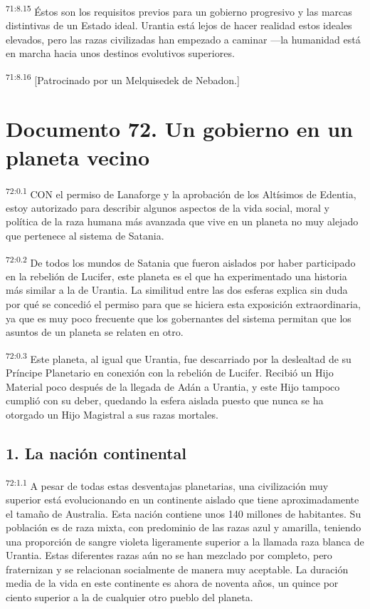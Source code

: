 \documentclass[twoside, 11pt]{book}
\begin{document}
\par
\textsuperscript{71:8.15} Éstos son los requisitos previos para un gobierno progresivo y las marcas distintivas de un Estado ideal. Urantia está lejos de hacer realidad estos ideales elevados, pero las razas civilizadas han empezado a caminar ---la humanidad está en marcha hacia unos destinos evolutivos superiores.

\par
\textsuperscript{71:8.16} [Patrocinado por un Melquisedek de Nebadon.]


\chapter{Documento 72. Un gobierno en un planeta vecino}
\par
\textsuperscript{72:0.1} CON el permiso de Lanaforge y la aprobación de los Altísimos de Edentia, estoy autorizado para describir algunos aspectos de la vida social, moral y política de la raza humana más avanzada que vive en un planeta no muy alejado que pertenece al sistema de Satania.

\par
\textsuperscript{72:0.2} De todos los mundos de Satania que fueron aislados por haber participado en la rebelión de Lucifer, este planeta es el que ha experimentado una historia más similar a la de Urantia. La similitud entre las dos esferas explica sin duda por qué se concedió el permiso para que se hiciera esta exposición extraordinaria, ya que es muy poco frecuente que los gobernantes del sistema permitan que los asuntos de un planeta se relaten en otro.

\par
\textsuperscript{72:0.3} Este planeta, al igual que Urantia, fue descarriado por la deslealtad de su Príncipe Planetario en conexión con la rebelión de Lucifer. Recibió un Hijo Material poco después de la llegada de Adán a Urantia, y este Hijo tampoco cumplió con su deber, quedando la esfera aislada puesto que nunca se ha otorgado un Hijo Magistral a sus razas mortales.

\section*{1. La nación continental}
\par
\textsuperscript{72:1.1} A pesar de todas estas desventajas planetarias, una civilización muy superior está evolucionando en un continente aislado que tiene aproximadamente el tamaño de Australia. Esta nación contiene unos 140 millones de habitantes. Su población es de raza mixta, con predominio de las razas azul y amarilla, teniendo una proporción de sangre violeta ligeramente superior a la llamada raza blanca de Urantia. Estas diferentes razas aún no se han mezclado por completo, pero fraternizan y se relacionan socialmente de manera muy aceptable. La duración media de la vida en este continente es ahora de noventa años, un quince por ciento superior a la de cualquier otro pueblo del planeta.
\end{document}
